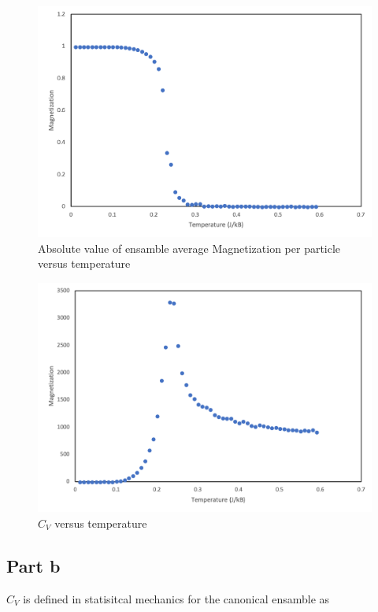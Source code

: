 \documentclass{article}
\begin{document}
		\begin{figure}[H]
				\centering
				\includegraphics[scale=0.5]{Mag2}
				\caption{Absolute value of ensamble average Magnetization per particle versus temperature}
		\end{figure}

		\begin{figure}[H]
				\centering
				\includegraphics[scale=0.5]{Cv}
				\caption{$C_V$ versus temperature}
		\end{figure}
		




\subsection*{Part b}

	$C_V$ is defined in statisitcal mechanics for the canonical ensamble as \
\end{document}
